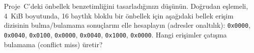 \begin{alistirma}[\zor]
Proje~C'deki önbellek benzetimliğini tasarladığınızı düşünün. Doğrudan eşlemeli, 4~KiB boyutunda, 16 baytlık bloklu bir önbellek için aşağıdaki bellek erişim dizisinin bulma/bulamama sonuçlarını elle hesaplayın (adresler onaltılık):
\texttt{0x0000}, \texttt{0x0040}, \texttt{0x0100}, \texttt{0x0000}, \texttt{0x0040}, \texttt{0x1000}, \texttt{0x0000}.
Hangi erişimler çatışma bulamama (conflict miss) üretir?
\end{alistirma}
